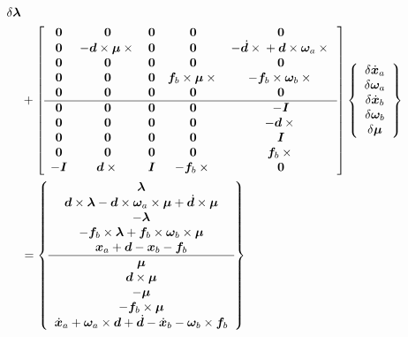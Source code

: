 \documentclass[10pt,dvips,fleqn,subeqn]{report}
\newcommand{\T}[1]{\bm{#1}}
\begin{document}
\begin{align}
{{		\delta\T{\lambda}
	}} \nonumber \\
	&+ \sqbr{\matr{ccccc}{
		\T{0} & \T{0} & \T{0} & \T{0} & \T{0} \\ 	%
		\T{0} & -\T{d}\times\T{\mu}\times{} &
			\T{0} & \T{0} & 
			- \dot{\T{d}}\times{}
			+ \T{d}\times\T{\omega}_a\times{} \\	%
		\T{0} & \T{0} & \T{0} & \T{0} & \T{0} \\	%
		\T{0} & \T{0} & \T{0} & \T{f}_b\times\T{\mu}\times{} &
			-\T{f}_b\times\T{\omega}_b\times{} \\	%
		\T{0} & \T{0} & \T{0} & \T{0} & \T{0} \\	%
%
	\hline
		\T{0} & \T{0} & \T{0} & \T{0} & -\T{I} \\	%
		\T{0} & \T{0} &
			\T{0} & \T{0} & -\T{d}\times{} \\	%
		\T{0} & \T{0} & \T{0} & \T{0} & \T{I} \\	%
		\T{0} & \T{0} & \T{0} & \T{0} &
			\T{f}_b\times{} \\	%
		-\T{I} & \T{d}\times{} & \T{I} & -\T{f}_b\times{} &
			\T{0} 					%
	}} \cubr{\cvvect{
		\delta\dot{\T{x}}_a \\
		\delta\T{\omega}_a \\
		\delta\dot{\T{x}}_b \\
		\delta\T{\omega}_b \\
		\delta\T{\mu}
	}} \nonumber \\
	&= \cubr{\cvvect{
		\T{\lambda} \\
		\T{d}\times\T{\lambda}
			- \T{d}\times\T{\omega}_a\times\T{\mu}
			+ \dot{\T{d}}\times\T{\mu} \\
		-\T{\lambda} \\
		-\T{f}_b\times\T{\lambda}
			+ \T{f}_b\times\T{\omega}_b\times\T{\mu} \\
		\T{x}_a + \T{d} - \T{x}_b - \T{f}_b \\
%
		\hline
		\T{\mu} \\
		\T{d}\times\T{\mu} \\
		-\T{\mu} \\
		-\T{f}_b\times\T{\mu} \\
		\dot{\T{x}}_a + \T{\omega}_a\times\T{d} + \dot{\T{d}}
			- \dot{\T{x}}_b - \T{\omega}_b\times\T{f}_b
	}}
\end{align}
\end{document}
